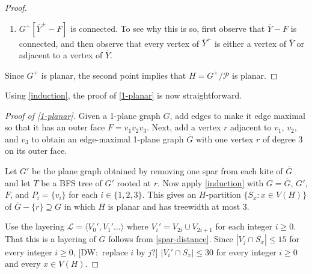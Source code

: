 \documentclass{patmorin}
\newcommand{\note}[2]{{\color{red}[#1:~#2]}}
\DeclareMathOperator{\dist}{dist}
\DeclarePairedDelimiter{\floor}{\lfloor}{\rfloor}
\renewcommand{\ge}{\geqslant}
\renewcommand{\le}{\leqslant}
\begin{document}
\begin{proof}
\begin{enumerate}
    \item $G^+[\overline{Y}^+-F]$ is connected. To see why this is so, first observe that $\overline{Y}-F$ is connected, and then observe that every vertex of $\overline{Y}^+$ is either a vertex of $\overline{Y}$ or adjacent to a vertex of $\overline{Y}$.
  \end{enumerate}
  Since $G^+$ is planar, the second point implies that $H=G^+/\mathcal{P}$ is planar.
\end{proof}

Using \cref{induction}, the proof of \cref{1-planar} is now straightforward. 

\begin{proof}[Proof of \cref{1-planar}]
Given a 1-plane graph $G$, add edges to make it edge maximal so that it has an outer face $F=v_1v_2v_3$. Next, add a vertex $r$ adjacent to $v_1$, $v_2$, and $v_3$ to obtain an edge-maximal 1-plane graph $\overline{G}$ with one vertex $r$ of degree 3 on its outer face. 
  
  Let $G'$ be the plane graph obtained by removing one spar from each kite of $\overline{G}$ and let $T$ be a BFS tree of $G'$ rooted at $r$.  Now apply \cref{induction} with $G=\overline{G}$, $G'$, $F$, and $P_i=\{v_i\}$ for each $i\in\{1,2,3\}$.  This gives an $H$-partition $\{S_x:x\in V(H)\}$ of $\overline{G}-\{r\}\supseteq G$ in which $H$ is planar and has treewidth at most 3.
  
  Use the layering $\mathcal{L}=\langle V_0',V_1'\ldots\rangle$ where $V_i'=V_{2i}\cup V_{2i+1}$ for each integer $i\ge 0$. That this is a layering of $G$ follows from \eqref{spar-distance}.  Since $|V_j\cap S_x|\le 15$ for every integer $i\ge 0$, \note{DW}{replace $i$ by $j$?} $|V_i'\cap S_x|\le 30$ for every integer $i\ge 0$ and every $x\in V(H)$.
\end{proof}

% 
\end{document}
